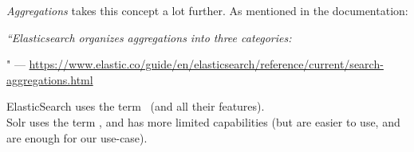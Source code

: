 \emph{Aggregations} takes this concept a lot further. As mentioned in the documentation:




\begin{displayquote}
	\emph{``Elasticsearch organizes aggregations into three categories:}

	" \newline
	--- \url{https://www.elastic.co/guide/en/elasticsearch/reference/current/search-aggregations.html}
\end{displayquote}

\bigskip

ElasticSearch uses the term \aggregation\ (and all their features). \\

Solr uses the term \faceting, and has more limited capabilities (but are easier to use, and are enough for our use-case). \\

